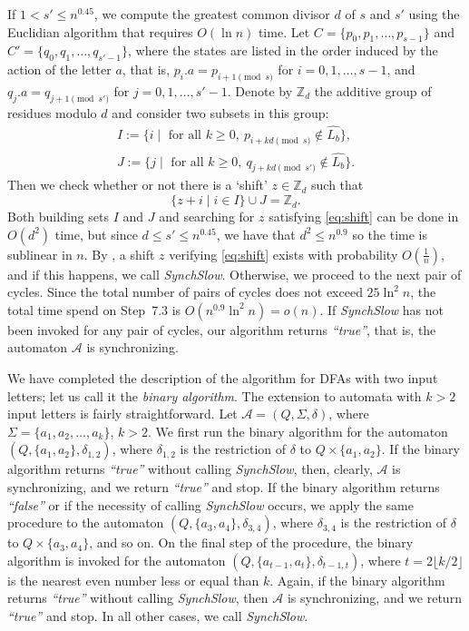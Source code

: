 \documentclass{jalc}
\begin{document}
If $1<s'\le n^{0.45}$, we compute the greatest common divisor $d$ of $s$ and $s'$ using the Euclidian algorithm that requires $O(\ln n)$ time. Let $C=\{p_0,p_1,\dots,p_{s-1}\}$ and $C'=\{q_0,q_1,\dots,q_{s'-1}\}$, where the states are listed in the order induced by the action of the letter $a$, that is, $p_i.a=p_{i+1\!\pmod{s}}$ for $i=0,1,\dots,s-1$, and $q_j.a=q_{j+1\!\pmod{s'}}$ for $j=0,1,\dots,s'-1$. Denote by $\mathbb{Z}_d$ the additive group of residues modulo $d$ and consider two subsets in this group:
\begin{gather*}
I:=\{i\mid\text{ for all } k\ge0,\ p_{i+kd\!\!\!\pmod{s}}\notin\widehat{L_b}\},\\
J:=\{j\mid\text{ for all } k\ge0,\ q_{j+kd\!\!\!\pmod{s'}}\notin\widehat{L_b}\}.
\end{gather*}
Then we check whether or not there is a `shift' $z\in\mathbb{Z}_d$ such that
\begin{equation}
\label{eq:shift}
\{z + i\mid i \in I\} \cup J = \mathbb{Z}_d.
\end{equation}
Both building sets $I$ and $J$ and searching for $z$ satisfying \eqref{eq:shift} can be done in $O(d^2)$ time, but since $d\le s'\le n^{0.45}$, we have that $d^2\le n^{0.9}$ so the time is sublinear in $n$. By \cite[Theorem~2, Case~2]{Berlinkov:preprint}, a shift $z$ verifying \eqref{eq:shift} exists with probability $O(\frac1n)$, and if this happens, we call \emph{SynchSlow}. Otherwise, we proceed to the next pair of cycles. Since the total number of pairs of cycles does not exceed $25 \ln^2{n}$, the total time spend on Step~7.3 is $O(n^{0.9} \ln^2{n})=o(n)$. If \emph{SynchSlow} has not been invoked for any pair of cycles, our algorithm returns \emph{``true''}, that is, the automaton $\mathcal{A}$ is synchronizing.

\smallskip

We have completed the description of the algorithm for DFAs with two input letters; let us call it the \emph{binary algorithm}. The extension to automata with $k>2$ input letters is fairly straightforward. Let $\mathcal{A}=(Q,\Sigma,\delta)$, where $\Sigma=\{a_1,a_2,\dots,a_k\}$, $k>2$. We first run the binary algorithm for the automaton $(Q,\{a_1,a_2\},\delta_{1,2})$, where $\delta_{1,2}$ is the restriction of $\delta$ to $Q\times\{a_1,a_2\}$. If the binary algorithm returns \emph{``true''} without calling \emph{SynchSlow}, then, clearly, $\mathcal{A}$ is synchronizing, and we return \emph{``true''} and stop. If the binary algorithm returns \emph{``false''} or if the necessity of calling \emph{SynchSlow} occurs, we apply the same procedure to the automaton $(Q,\{a_3,a_4\},\delta_{3,4})$, where $\delta_{3,4}$ is the restriction of $\delta$ to $Q\times\{a_3,a_4\}$, and so on. On the final step of the procedure, the binary algorithm is invoked for the automaton $(Q,\{a_{t-1},a_t\},\delta_{t-1, t})$, where $t=2\lfloor k/2\rfloor$ is the nearest even number less or equal than $k$. Again, if the binary algorithm returns \emph{``true''} without calling \emph{SynchSlow}, then $\mathcal{A}$ is synchronizing, and we return \emph{``true''} and stop. In all other cases, we call \emph{SynchSlow}.
\end{document}
